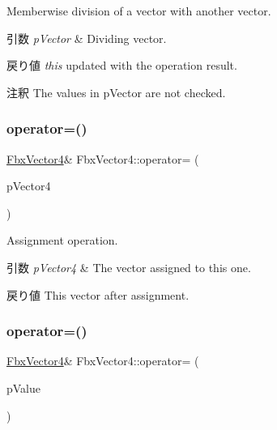 Memberwise division of a vector with another vector. 
\begin{DoxyParams}{引数}
{\em p\+Vector} & Dividing vector. \\
\hline
\end{DoxyParams}
\begin{DoxyReturn}{戻り値}
{\itshape this} updated with the operation result. 
\end{DoxyReturn}
\begin{DoxyRemark}{注釈}
The values in p\+Vector are not checked. 
\end{DoxyRemark}
\mbox{\label{class_fbx_vector4_a0080c936a55f46673fe7cbbb0d405f7b}} 
\subsubsection{\texorpdfstring{operator=()}{operator=()}\hspace{0.1cm}{\footnotesize\ttfamily [1/3]}}
{\footnotesize\ttfamily \hyperlink{class_fbx_vector4}{Fbx\+Vector4}\& Fbx\+Vector4\+::operator= (\begin{DoxyParamCaption}\item[{const \hyperlink{class_fbx_vector4}{Fbx\+Vector4} \&}]{p\+Vector4 }\end{DoxyParamCaption})}

Assignment operation. 
\begin{DoxyParams}{引数}
{\em p\+Vector4} & The vector assigned to this one. \\
\hline
\end{DoxyParams}
\begin{DoxyReturn}{戻り値}
This vector after assignment. 
\end{DoxyReturn}
\mbox{\label{class_fbx_vector4_aa769657f335b31564497a8950fc50213}} 
\subsubsection{\texorpdfstring{operator=()}{operator=()}\hspace{0.1cm}{\footnotesize\ttfamily [2/3]}}
{\footnotesize\ttfamily \hyperlink{class_fbx_vector4}{Fbx\+Vector4}\& Fbx\+Vector4\+::operator= (\begin{DoxyParamCaption}\item[{const double $\ast$}]{p\+Value }\end{DoxyParamCaption})}

